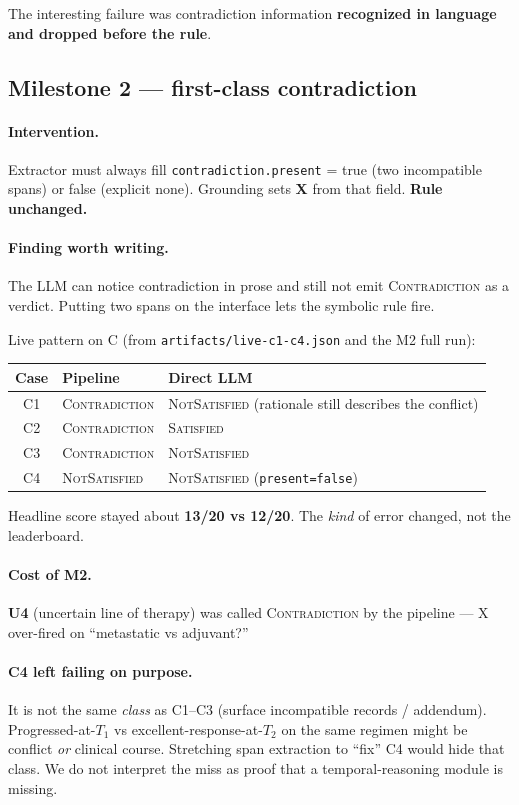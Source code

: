 \documentclass[11pt,a4paper]{article}
\newcommand{\sat}{\textsc{Satisfied}}
\newcommand{\nsat}{\textsc{NotSatisfied}}
\newcommand{\con}{\textsc{Contradiction}}
\begin{document}
The interesting failure was contradiction information \textbf{recognized in language and dropped before the rule}.

\subsection{Milestone 2 --- first-class contradiction}

\paragraph{Intervention.}
Extractor must always fill \texttt{contradiction.present} = true (two incompatible spans) or false (explicit none).
Grounding sets \textbf{X} from that field.
\textbf{Rule unchanged.}

\paragraph{Finding worth writing.}
The LLM can notice contradiction in prose and still not emit \con{} as a verdict.
Putting two spans on the interface lets the symbolic rule fire.

Live pattern on C (from \texttt{artifacts/live-c1-c4.json} and the M2 full run):

\begin{center}
\begin{tabular}{@{}c l l@{}}
\toprule
Case & Pipeline & Direct LLM \\
\midrule
C1 & \con & \nsat{} (rationale still describes the conflict) \\
C2 & \con & \sat \\
C3 & \con & \nsat \\
C4 & \nsat & \nsat{} (\texttt{present=false}) \\
\bottomrule
\end{tabular}
\end{center}

Headline score stayed about \textbf{13/20 vs 12/20}. The \emph{kind} of error changed, not the leaderboard.

\paragraph{Cost of M2.}
\textbf{U4} (uncertain line of therapy) was called \con{} by the pipeline --- X over-fired on ``metastatic vs adjuvant?''

\paragraph{C4 left failing on purpose.}
It is not the same \emph{class} as C1--C3 (surface incompatible records / addendum).
Progressed-at-$T_1$ vs excellent-response-at-$T_2$ on the same regimen might be conflict \emph{or} clinical course.
Stretching span extraction to ``fix'' C4 would hide that class.
We do not interpret the miss as proof that a temporal-reasoning module is missing.
\end{document}
